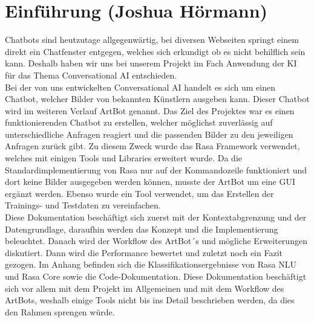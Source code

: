 \section{Einführung (Joshua Hörmann)}
Chatbots sind heutzutage allgegenwärtig, bei diversen Webseiten springt einem direkt ein Chatfenster entgegen, welches sich erkundigt ob es nicht behilflich sein kann. Deshalb haben wir uns bei unserem Projekt im Fach Anwendung der KI für das Thema Conversational AI entschieden. \\
Bei der von uns entwickelten  Conversational AI handelt es sich um einen Chatbot, welcher Bilder von bekannten Künstlern ausgeben kann. Dieser Chatbot wird im weiteren Verlauf ArtBot genannt. Das Ziel des Projektes war es einen funktionierenden Chatbot zu erstellen, welcher möglichst zuverlässig auf unterschiedliche Anfragen reagiert und die passenden Bilder zu den jeweiligen Anfragen zurück gibt. Zu diesem Zweck wurde das Rasa Framework verwendet, welches mit einigen Tools und Libraries erweitert wurde. Da die Standardimplementierung von Rasa nur auf der Kommandozeile funktioniert und dort keine Bilder ausgegeben werden können, musste der ArtBot um eine GUI ergänzt werden. Ebenso wurde ein Tool verwendet, um das Erstellen der Trainings- und Testdaten zu vereinfachen. \\
Diese Dokumentation beschäftigt sich zuerst mit der Kontextabgrenzung und der Datengrundlage, daraufhin werden das Konzept und die Implementierung beleuchtet. Danach wird der Workflow des ArtBot´s und mögliche Erweiterungen diskutiert. Dann wird die Performance bewertet und zuletzt noch ein Fazit gezogen. Im Anhang befinden sich die Klassifikationsergebnisse von Rasa NLU und Rasa Core sowie die Code-Dokumentation. Diese Dokumentation beschäftigt sich vor allem mit dem Projekt im Allgemeinen und mit dem Workflow des ArtBots, weshalb einige Tools nicht bis ins Detail beschrieben werden, da dies den Rahmen sprengen würde. 


\newpage
